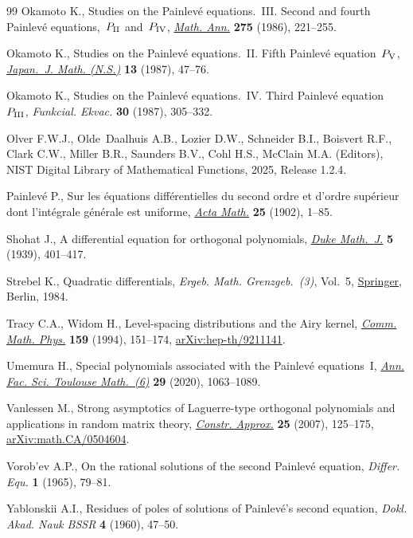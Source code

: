 \documentclass[pdftex]{sigma}
\numberwithin{equation}{section}
\theoremstyle{definition}
\begin{document}
\begin{thebibliography}{99}
Okamoto K., Studies on the {P}ainlev\'e equations.~{III}. {S}econd and fourth
 {P}ainlev\'e equations,~{$P_{{\rm II}}$} and~{$P_{{\rm IV}}$},
 \href{https://doi.org/10.1007/BF01458459}{\textit{Math. Ann.}} \textbf{275}
 (1986), 221--255.

Okamoto K., Studies on the {P}ainlev\'e equations.~{II}. {F}ifth {P}ainlev\'e
 equation~{$P_{\rm V}$},
 \href{https://doi.org/10.4099/math1924.13.47}{\textit{Japan.~J. Math.
 (N.S.)}} \textbf{13} (1987), 47--76.

Okamoto K., Studies on the {P}ainlev\'e equations.~{IV}. {T}hird {P}ainlev\'e
 equation~{$P_{{\rm III}}$}, \textit{Funkcial. Ekvac.} \textbf{30} (1987),
 305--332.

Olver F.W.J., Olde~Daalhuis A.B., Lozier D.W., Schneider B.I., Boisvert R.F.,
 Clark C.W., Miller B.R., Saunders B.V., Cohl H.S., McClain M.A. (Editors),
 NIST Digital Library of Mathematical Functions, 2025, Release 1.2.4.

Painlev\'e P., Sur les \'equations diff\'erentielles du second ordre et d'ordre
 sup\'erieur dont l'int\'egrale g\'en\'erale est uniforme,
 \href{https://doi.org/10.1007/BF02419020}{\textit{Acta Math.}} \textbf{25}
 (1902), 1--85.

Shohat J., A differential equation for orthogonal polynomials,
 \href{https://doi.org/10.1215/S0012-7094-39-00534-X}{\textit{Duke Math.~J.}}
 \textbf{5} (1939), 401--417.

Strebel K., Quadratic differentials, \textit{Ergeb. Math. Grenzgeb.~(3)},
 Vol.~5, \href{https://doi.org/10.1007/978-3-662-02414-0}{Springer}, Berlin,
 1984.

Tracy C.A., Widom H., Level-spacing distributions and the {A}iry kernel,
 \href{https://doi.org/10.1007/BF02100489}{\textit{Comm. Math. Phys.}}
 \textbf{159} (1994), 151--174,
 \href{http://arxiv.org/abs/hep-th/9211141}{arXiv:hep-th/9211141}.

Umemura H., Special polynomials associated with the {P}ainlev\'e equations~{I},
 \href{https://doi.org/10.5802/afst.1657}{\textit{Ann. Fac. Sci. Toulouse
 Math.~(6)}} \textbf{29} (2020), 1063--1089.

Vanlessen M., Strong asymptotics of {L}aguerre-type orthogonal polynomials and
 applications in random matrix theory,
 \href{https://doi.org/10.1007/s00365-005-0611-z}{\textit{Constr. Approx.}}
 \textbf{25} (2007), 125--175,
 \href{http://arxiv.org/abs/math.CA/0504604}{arXiv:math.CA/0504604}.

Vorob'ev A.P., On the rational solutions of the second {P}ainlev\'e equation,
 \textit{Differ. Equ.} \textbf{1} (1965), 79--81.

Yablonskii A.I., Residues of poles of solutions of Painlev\'e's second
 equation, \textit{Dokl. Akad. Nauk BSSR} \textbf{4} (1960), 47--50.

\end{thebibliography}\LastPageEnding
\end{document}
